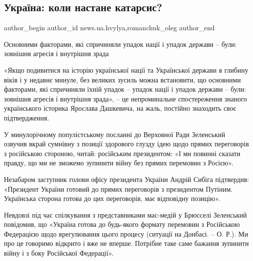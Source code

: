  
 
 
 
 
\subsection{Україна: коли настане катарсис?}
\label{sec:18_01_2022.stz.news.ua.hvylya.1.katarsis}

\ifcmt
 author_begin
   author_id news.ua.hvylya,romanchuk_oleg
 author_end
\fi

\begin{zznagolos}
Основними факторами, які спричиняли упадок нації і упадок держави – були: зовнішня агресія і внутрішня зрада	
\end{zznagolos}

«Якщо подивитися на історію української нації та Української держави в глибину
віків і у недавнє минуле, без великих зусиль можна встановити, що основними
факторами, які спричиняли їхній упадок – упадок нації і упадок держави – були:
зовнішня агресія і внутрішня зрада», – це непроминальне спостереження знаного
українського історика Ярослава Дашкевича, на жаль, постійно знаходить своє
підтвердження.


У минулорічному популістському посланні до Верховної Ради Зеленський озвучив
вкрай сумнівну з позиції здорового глузду ідею щодо прямих переговорів з
російською стороною, читай: російським президентом: «І ми повинні сказати
правду, що ми не зможемо зупинити війну без прямих перемовин з Росією».

Незабаром заступник голови офісу президента України Андрій Сибіга підтвердив:
«Президент України готовий до прямих переговорів з президентом Путіним.
Українська сторона готова до цих переговорів, має відповідну позицію».

Невдовзі під час спілкування з представниками мас-медій у Брюсселі Зеленський
повідомив, що «Україна готова до будь-якого формату перемовин з Російською
Федерацією щодо врегулювання цього процесу (ситуації на Донбасі. – О. Р.). Ми
про це говоримо відкрито і вже не вперше. Потрібне таке саме бажання зупинити
війну і з боку Російської Федерації».

